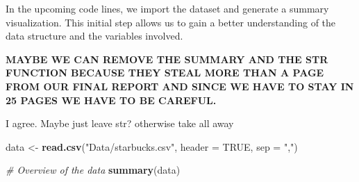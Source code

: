 \documentclass[
]{article}
\newenvironment{Shaded}{\begin{snugshade}}{\end{snugshade}}
\newcommand{\AttributeTok}[1]{\textcolor[rgb]{0.13,0.29,0.53}{#1}}
\newcommand{\CommentTok}[1]{\textcolor[rgb]{0.56,0.35,0.01}{\textit{#1}}}
\newcommand{\ConstantTok}[1]{\textcolor[rgb]{0.56,0.35,0.01}{#1}}
\newcommand{\FunctionTok}[1]{\textcolor[rgb]{0.13,0.29,0.53}{\textbf{#1}}}
\newcommand{\NormalTok}[1]{#1}
\newcommand{\OtherTok}[1]{\textcolor[rgb]{0.56,0.35,0.01}{#1}}
\newcommand{\StringTok}[1]{\textcolor[rgb]{0.31,0.60,0.02}{#1}}
\begin{document}
In the upcoming code lines, we import the dataset and generate a summary
visualization. This initial step allows us to gain a better
understanding of the data structure and the variables involved.

\textbf{MAYBE WE CAN REMOVE THE SUMMARY AND THE STR FUNCTION BECAUSE
THEY STEAL MORE THAN A PAGE FROM OUR FINAL REPORT AND SINCE WE HAVE TO
STAY IN 25 PAGES WE HAVE TO BE CAREFUL.}

I agree. Maybe just leave str? otherwise take all away

\begin{Shaded}
\begin{Highlighting}[]
\NormalTok{data }\OtherTok{\textless{}{-}} \FunctionTok{read.csv}\NormalTok{(}\StringTok{"Data/starbucks.csv"}\NormalTok{, }\AttributeTok{header =} \ConstantTok{TRUE}\NormalTok{, }\AttributeTok{sep =} \StringTok{","}\NormalTok{)}

\CommentTok{\# Overview of the data}
\FunctionTok{summary}\NormalTok{(data)}
\end{Highlighting}
\end{Shaded}
\end{document}
